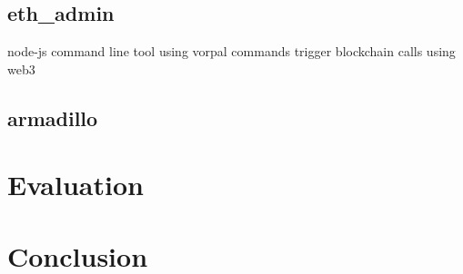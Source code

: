 \documentclass[runningheads]{llncs}
\begin{document}
\subsection{eth\_admin}

node-js command line tool using vorpal
commands trigger blockchain calls using web3

\subsection{armadillo}

\section{Evaluation}


\section{Conclusion}
\end{document}
